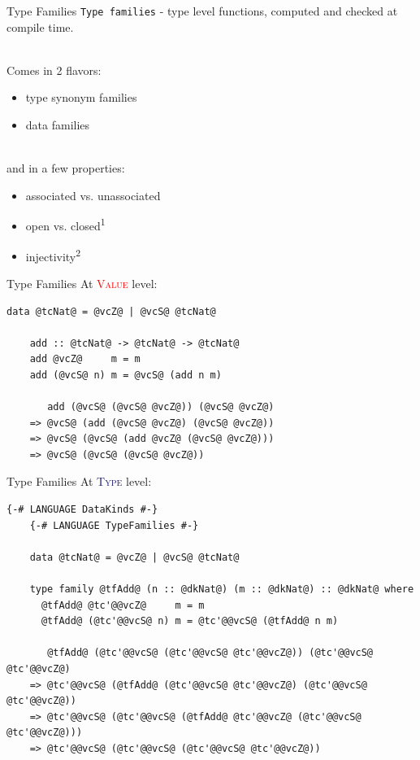 \documentclass[xcolor={usenames,dvipsnames}]{beamer}
\newcommand{\htycon}[1]{\textcolor{MidnightBlue}{\textsc{#1}}}
\newcommand{\hvalcon}[1]{\textcolor{Red}{\textsc{#1}}}
\begin{document}
\begin{frame}[fragile]{Type Families}
  \texttt{Type families} - type level functions, computed and checked at compile time.

  \ \\
  \pause
  Comes in 2 flavors:
  \begin{itemize}
    \item type synonym families
    \item data families
  \end{itemize}

  \ \\
  \pause
  and in a few properties:
  \begin{itemize}
    \item associated vs. unassociated
    \item open vs. closed\textsuperscript{1}
    \item injectivity\textsuperscript{2}
  \end{itemize}
\end{frame}

\begin{frame}[fragile]{Type Families}
  At \hvalcon{Value} level:
  \begin{lstlisting}[style=hask]
    data @tcNat@ = @vcZ@ | @vcS@ @tcNat@

    add :: @tcNat@ -> @tcNat@ -> @tcNat@
    add @vcZ@     m = m
    add (@vcS@ n) m = @vcS@ (add n m)

       add (@vcS@ (@vcS@ @vcZ@)) (@vcS@ @vcZ@)
    => @vcS@ (add (@vcS@ @vcZ@) (@vcS@ @vcZ@))
    => @vcS@ (@vcS@ (add @vcZ@ (@vcS@ @vcZ@)))
    => @vcS@ (@vcS@ (@vcS@ @vcZ@))
  \end{lstlisting}
\end{frame}

\begin{frame}[fragile]{Type Families}
  At \htycon{Type} level:
  \begin{lstlisting}[style=hask]
    {-# LANGUAGE DataKinds #-}
    {-# LANGUAGE TypeFamilies #-}

    data @tcNat@ = @vcZ@ | @vcS@ @tcNat@

    type family @tfAdd@ (n :: @dkNat@) (m :: @dkNat@) :: @dkNat@ where
      @tfAdd@ @tc'@@vcZ@     m = m
      @tfAdd@ (@tc'@@vcS@ n) m = @tc'@@vcS@ (@tfAdd@ n m)

       @tfAdd@ (@tc'@@vcS@ (@tc'@@vcS@ @tc'@@vcZ@)) (@tc'@@vcS@ @tc'@@vcZ@)
    => @tc'@@vcS@ (@tfAdd@ (@tc'@@vcS@ @tc'@@vcZ@) (@tc'@@vcS@ @tc'@@vcZ@))
    => @tc'@@vcS@ (@tc'@@vcS@ (@tfAdd@ @tc'@@vcZ@ (@tc'@@vcS@ @tc'@@vcZ@)))
    => @tc'@@vcS@ (@tc'@@vcS@ (@tc'@@vcS@ @tc'@@vcZ@))
  \end{lstlisting}
\end{frame}
\end{document}
